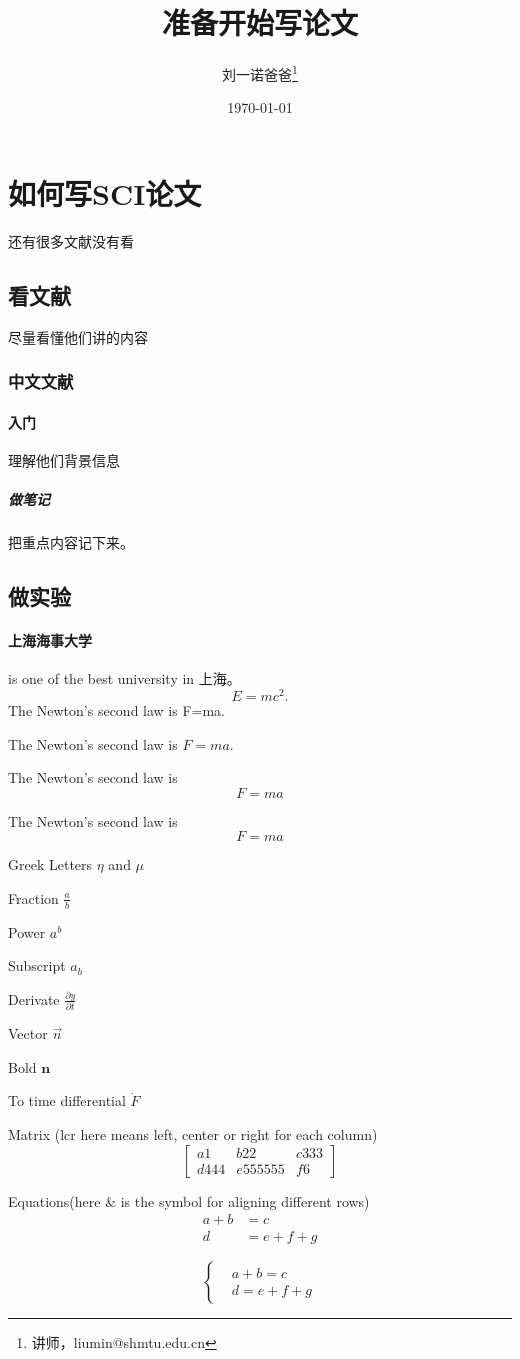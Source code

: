 \documentclass[UTF8]{ctexart}
\title{准备开始写论文}
\author{刘一诺爸爸\thanks{讲师，liumin@shmtu.edu.cn}}
\date{\today}
\begin{document}
\maketitle
\tableofcontents
\section{如何写SCI论文}
还有很多文献没有看
\subsection{看文献}
尽量看懂他们讲的内容
\subsubsection{中文文献}
\paragraph{入门}
理解他们背景信息
\subparagraph{做笔记}
把重点内容记下来。
\subsection{做实验}
\paragraph{上海海事大学} is one of the best university in 上海。
\begin{equation}
    E=mc^2.
\end{equation}
The Newton's second law is F=ma.

The Newton's second law is $F=ma$.

The Newton's second law is
$$F=ma$$

The Newton's second law is
\[F=ma\]

Greek Letters $\eta$ and $\mu$

Fraction $\frac{a}{b}$

Power $a^b$

Subscript $a_b$

Derivate $\frac{\partial y}{\partial t} $

Vector $\vec{n}$

Bold $\mathbf{n}$

To time differential $\dot{F}$

Matrix (lcr here means left, center or right for each column)
\[
    \left[
        \begin{array}{lcr}
            a1 & b22 & c333 \\
            d444 & e555555 & f6
        \end{array}
        \right]
\]

Equations(here \& is the symbol for aligning different rows)
\begin{align}
    a+b&=c\\
    d&=e+f+g
\end{align}

\[
    \left\{
        \begin{aligned}
            &a+b=c\\
            &d=e+f+g
        \end{aligned}
        \right.
    \]
\end{document}
